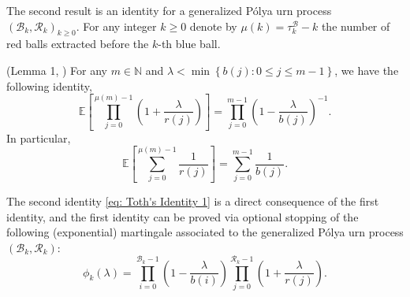 \documentclass[EJP]{ejpecp} %
\begin{document}
The second result is an identity for a generalized P\'{o}lya urn process $(\mathscr{B}_{k},\mathscr{R}_{k})_{k \ge 0}$. For any integer $k\geq 0$ denote by $\mu(k)= \tau^{\mathscr{B}}_k - k$ the number of red balls extracted before the $k$-th blue ball. 
\begin{lemma}(Lemma 1, \cite{T96}) \label{lm: Toth's Identity}
	For any $m\in \mathbb{N}$ and $\lambda < \min\left\{ b(j): 0\leq j\leq m-1 \right\}$, we have the following identity,
	$$  \mathbb{E}\left[  \prod_{j=0}^{ \mu(m)-1 } \left(1+ \frac{\lambda}{r(j)}   \right) \right] =   \prod_{j=0}^{ m-1 } \left(1- \frac{\lambda}{b(j)}   \right)^{-1}.   $$ 
	In particular, 
	\begin{equation}\label{eq: Toth's Identity 1}
		\mathbb{E}\left[  \sum_{j=0}^{ \mu(m)-1 } \frac{1}{r(j)}   \right] =   \sum_{j=0}^{ m-1 } \frac{1}{b(j)}.
	\end{equation}	
\end{lemma}
The second identity \eqref{eq: Toth's Identity 1} is a direct consequence of the first identity, and the first identity can be proved via optional stopping of the following (exponential) martingale associated to the generalized P\'{o}lya urn process $(\mathscr{B}_{k},\mathscr{R}_{k})$: 
\[
\phi_k(\lambda) = \prod_{i=0}^{ \mathscr{B}_{k}-1 } \left(1-\frac{\lambda}{b(i)}\right) \prod_{j=0}^{\mathscr{R}_{k}-1 } \left(1+\frac{\lambda}{r(j)}\right)
.\]
\end{document}
